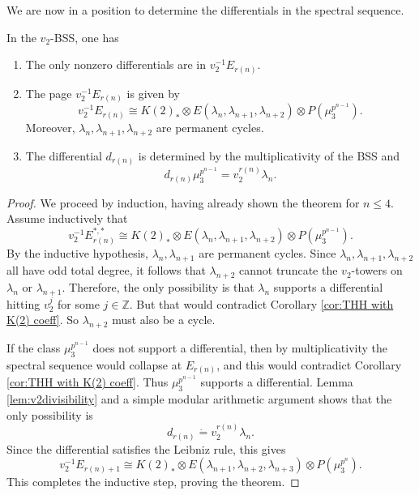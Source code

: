 We are now in a position to determine the differentials in the spectral sequence. 

\begin{thm}
In the $v_2$-BSS, one has 
\begin{enumerate}
	\item The only nonzero differentials are in $v_2^{-1}E_{r(n)}$.
	\item The page $v_2^{-1}E_{r(n)}$ is given by 
	\[
	v_2^{-1}E_{r(n)}\cong K(2)_*\otimes E(\lambda_n, \lambda_{n+1}, \lambda_{n+2})\otimes P(\mu_3^{p^{n-1}}). 
	\]
	Moreover, $\lambda_n, \lambda_{n+1},\lambda_{n+2}$ are permanent cycles. 
	\item The differential $d_{r(n)}$ is determined by the multiplicativity of the BSS and 
	\[
	d_{r(n)}\mu_3^{p^{n-1}}=v_2^{r(n)}\lambda_n. 
	\]
\end{enumerate}	
\end{thm}
\begin{proof}
	We proceed by induction, having already shown the theorem for $n\leq 4$. Assume inductively that 
	\[
	v_2^{-1}E_{r(n)}^{*,*}\cong K(2)_*\otimes E(\lambda_n, \lambda_{n+1}, \lambda_{n+2})\otimes P(\mu_3^{p^{n-1}}).
	\] 
	By the inductive hypothesis, $\lambda_n, \lambda_{n+1}$ are permanent cycles. Since $\lambda_n, \lambda_{n+1}, \lambda_{n+2}$ all have odd total degree, it follows that $\lambda_{n+2}$ cannot truncate the $v_2$-towers on $\lambda_n$ or $\lambda_{n+1}$. Therefore, the only possibility is that $\lambda_n$ supports a differential hitting $v_2^j$ for some $j\in \mathbb{Z }$. %
	But that would contradict Corollary \ref{cor:THH with K(2) coeff}. So $\lambda_{n+2}$ must also be a cycle.
	
	If the class $\mu_3^{p^{n-1}}$ does not support a differential, then by multiplicativity the spectral sequence would collapse at $E_{r(n)}$, and this would contradict Corollary \ref{cor:THH with K(2) coeff}. Thus $\mu_3^{p^{n-1}}$ supports a differential. Lemma \ref{lem:v2divisibility} and a simple modular arithmetic argument shows that the only possibility is 
	\[
	d_{r(n)}\dot{=}v_2^{r(n)}\lambda_n.
	\]
	Since the differential satisfies the Leibniz rule, this gives
	\[
	v_2^{-1}E_{r(n)+1}\cong K(2)_*\otimes E(\lambda_{n+1},\lambda_{n+2}, \lambda_{n+3})\otimes P(\mu_{3}^{p^n}).
	\]
	This completes the inductive step, proving the theorem.
\end{proof}



